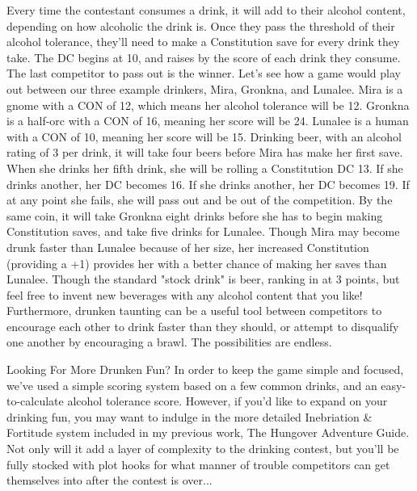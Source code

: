 \documentclass[10pt,a4paper,twoside,bg=print,twocolumn,openany,nodeprecatedcode]{dndbook}
\begin{document}
Every time the contestant consumes a drink, it will add to their alcohol content, depending on how alcoholic the drink is. Once they pass the threshold of their alcohol tolerance, they'll need to make a Constitution save for every drink they take. The DC begins at 10, and raises by the score of each drink they consume. The last competitor to pass out is the winner.
Let's see how a game would play out between our three example drinkers, Mira, Gronkna, and Lunalee. Mira is a gnome with a CON of 12, which means her alcohol tolerance will be 12. Gronkna is a half-orc with a CON of 16, meaning her score will be 24. Lunalee is a human with a CON of 10, meaning her score will be 15.
Drinking beer, with an alcohol rating of 3 per drink, it will take four beers before Mira has make her first save. When she drinks her fifth drink, she will be rolling a Constitution DC 13. If she drinks another, her DC becomes 16. If she drinks another, her DC becomes 19. If at any point she fails, she will pass out and be out of the competition. By the same coin, it will take Gronkna eight drinks before she has to begin making Constitution saves, and take five drinks for Lunalee. Though Mira may become drunk faster than Lunalee because of her size, her increased Constitution (providing a +1) provides her with a better chance of making her saves than Lunalee.
Though the standard "stock drink" is beer, ranking in at 3 points, but feel free to invent new beverages with any alcohol content that you like! Furthermore, drunken taunting can be a useful tool between competitors to encourage each other to drink faster than they should, or attempt to disqualify one another by encouraging a brawl. The possibilities are endless.
\begin{DndSidebar}[float=!b]{Looking For More Drunken Fun?}
In order to keep the game simple and focused, we've used a simple scoring system based on a few common drinks, and an easy-to-calculate alcohol tolerance score. However, if you'd like to expand on your drinking fun, you may want to indulge in the more detailed Inebriation \& Fortitude system included in my previous work, The Hungover Adventure Guide. Not only will it add a layer of complexity to the drinking contest, but you'll be fully stocked with plot hooks for what manner of trouble competitors can get themselves into after the contest is over...


\end{DndSidebar}
\end{document}
